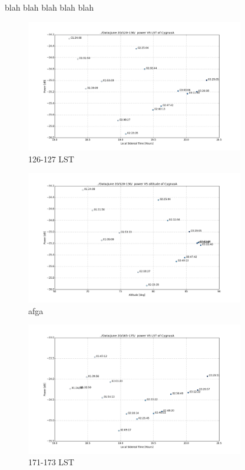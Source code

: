 \documentclass[preprint]{aastex}  %
\begin{document}
blah blah blah blah blah
\begin{figure}[H]
	\begin{center}
	\includegraphics[width =0.85\textwidth]{spectra_plots/126127LSTdB}
	\caption{126-127 LST
\label{Fig:126127LST} }
	\end{center}
\end{figure}


\begin{figure}[H]
	\begin{center}
	\includegraphics[width =0.85\textwidth]{spectra_plots/126127altdB}
	\caption{afga
\label{Fig:126127alt} }
	\end{center}
\end{figure}

\begin{figure}[H]
	\begin{center}
	\includegraphics[width =0.85\textwidth]{spectra_plots/171173LSTdB}
	\caption{171-173 LST
\label{Fig:171173LST} }
	\end{center}
\end{figure}
\end{document}
